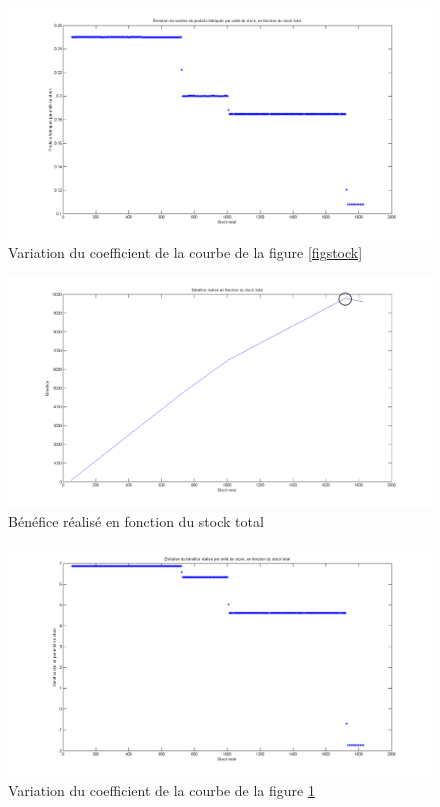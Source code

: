 \documentclass[paper=a4, fontsize=11pt]{report}
\numberwithin{equation}{section}		%
\numberwithin{figure}{section}			%
\numberwithin{table}{section}				%
\begin{document}
\begin{figure}[H]
\caption{Variation du coefficient de la courbe de la figure \ref{figstock}}
\centering
\includegraphics[width=16cm]{figures/nbProduitsFctStockTotal_Coeff.png}
\end{figure}

\begin{figure}[H]
\caption{Bénéfice réalisé en fonction du stock total \label{figben}}
\centering
\includegraphics[width=16cm]{figures/BenefFctStockTotal.png}
\end{figure}

\begin{figure}[H]
\caption{Variation du coefficient de la courbe de la figure \ref{figben}}
\centering
\includegraphics[width=16cm]{figures/BenefFctStockTotal_Coeff.png}
\end{figure}
\end{document}

